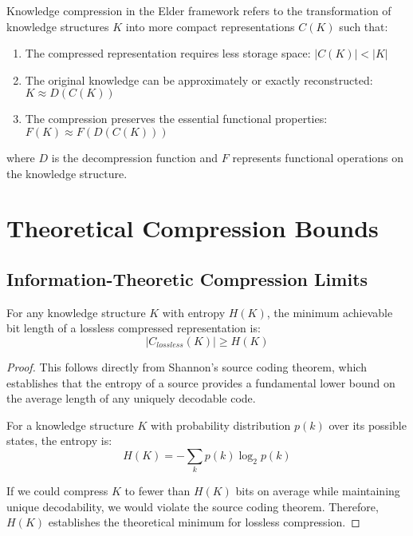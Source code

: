 \begin{definition}
Knowledge compression in the Elder framework refers to the transformation of knowledge structures $K$ into more compact representations $C(K)$ such that:
\begin{enumerate}
    \item The compressed representation requires less storage space: $|C(K)| < |K|$
    \item The original knowledge can be approximately or exactly reconstructed: $K \approx D(C(K))$
    \item The compression preserves the essential functional properties: $F(K) \approx F(D(C(K)))$
\end{enumerate}
where $D$ is the decompression function and $F$ represents functional operations on the knowledge structure.
\end{definition}

\section{Theoretical Compression Bounds}

\subsection{Information-Theoretic Compression Limits}

\begin{theorem}
For any knowledge structure $K$ with entropy $H(K)$, the minimum achievable bit length of a lossless compressed representation is:
\begin{equation}
|C_{lossless}(K)| \geq H(K)
\end{equation}
\end{theorem}

\begin{proof}
This follows directly from Shannon's source coding theorem, which establishes that the entropy of a source provides a fundamental lower bound on the average length of any uniquely decodable code.

For a knowledge structure $K$ with probability distribution $p(k)$ over its possible states, the entropy is:
\begin{equation}
H(K) = -\sum_k p(k) \log_2 p(k)
\end{equation}

If we could compress $K$ to fewer than $H(K)$ bits on average while maintaining unique decodability, we would violate the source coding theorem. Therefore, $H(K)$ establishes the theoretical minimum for lossless compression.
\end{proof}

